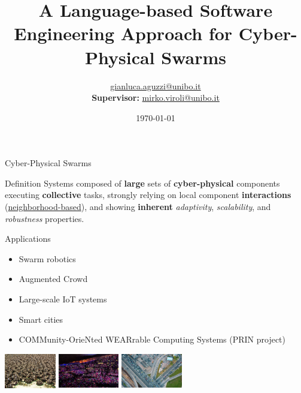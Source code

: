 \documentclass[presentation, 8pt,169]{beamer}\mode<presentation>{\usetheme{AMSBolognaFC}}
\title[A Soft-Eng Approach for CPSWs!]
{A Language-based Software Engineering Approach for Cyber-Physical Swarms}
\author[\sspeaker{G.Aguzzi}]
{\speaker{Gianluca Aguzzi} \href{mailto:gianluca.aguzzi@unibo.it}{gianluca.aguzzi@unibo.it} \\
\textbf{Supervisor:} \speaker{Mirko Viroli} \href{mailto:mirko.viroli@unibo.it}{mirko.viroli@unibo.it}}
\institute[DISI, Univ.\ Bologna]
{%
\textsc{Alma Mater Studiorum} -- Universit{\`a} di Bologna \\[0.1cm]
\textbf{PhD defense}\\[0.15cm]
}
\date[\today]{\today}
\begin{document}

\frame{\titlepage}

\section*{\refname}

\begin{frame}{Cyber-Physical Swarms}
  \begin{exampleblock}{Definition}
    Systems composed of \textbf{large} sets of \textbf{cyber-physical} components executing \textbf{collective} tasks, strongly relying on local component \textbf{interactions} (\underline{neighborhood-based}), and showing \textbf{inherent} \emph{adaptivity}, \emph{scalability}, and \emph{robustness} properties.
\end{exampleblock}
\begin{alertblock}{Applications}
  \begin{multicols}{3}
    \begin{itemize}
      \item Swarm robotics
      \item Augmented Crowd
      \item Large-scale IoT systems
      \item Smart cities
      \item COMMunity-OrieNted WEARrable Computing Systems (PRIN project)
    \end{itemize}
  \end{multicols}
  \begin{center}
    \includegraphics[height=1.5cm]{img/swarms.jpg}
    \includegraphics[height=1.5cm]{img/coldplay.jpg}
    \includegraphics[height=1.5cm]{img/traffic.jpg} 

\end{center}
\end{alertblock}
\end{frame}
\end{document}
